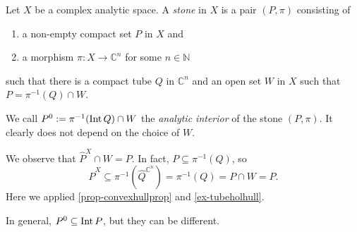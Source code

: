 \begin{definition}\label{def-stone}
    Let $X$ be a complex analytic space. A \emph{stone} in $X$ is a pair $(P,\pi)$ consisting of 
    \begin{enumerate}
        \item a non-empty compact set $P$ in $X$ and
        \item a morphism $\pi:X\rightarrow \mathbb{C}^n$ for some $n \in \mathbb{N}$
    \end{enumerate}
    such that there is a compact tube $Q$ in $\mathbb{C}^n$ and an open set $W$ in $X$ such that $P=\pi^{-1}(Q)\cap W$.

    We call $P^0:=\pi^{-1}(\operatorname{Int} Q)\cap W$ the \emph{analytic interior} of the stone $(P,\pi)$. It clearly does not depend on the choice of $W$.
\end{definition}
We observe that $\hat{P}^X\cap W=P$. In fact, $P\subseteq \pi^{-1}(Q)$, so
\[
    \hat{P}^X\subseteq \pi^{-1}(\hat{Q}^{\mathbb{C}^n})=\pi^{-1}(Q)=P\cap W=P.  
\]
Here we applied \cref{prop-convexhullprop} and \cref{ex-tubeholhull}.

In general, $P^0\subseteq \operatorname{Int} P$, but they can be different.

